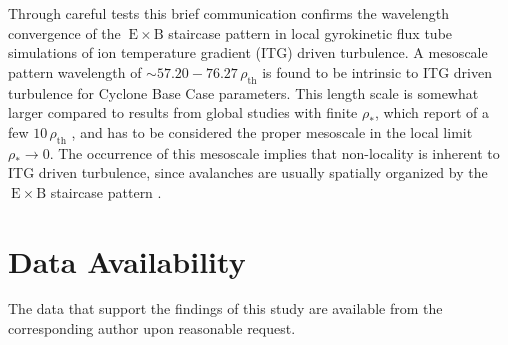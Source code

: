\documentclass[aip, amsmath, amssymb, reprint, twocolumn]{revtex4-1}
\newcommand{\exb}{\mathrm{\:E}\times\mathrm{B}}
\newcommand{\rhoth}{\rho_\mathrm{th}}
\begin{document}

Through careful tests this brief communication confirms the wavelength convergence of the $\exb$ staircase pattern in local gyrokinetic flux tube simulations of ion temperature gradient (ITG) driven turbulence.
A mesoscale pattern wavelength of $\sim 57.20 - 76.27\,\rhoth$ is found to be intrinsic to ITG driven turbulence for Cyclone Base Case parameters.
This length scale is somewhat larger compared to results from global studies with finite $\rho_\ast$, which report of a few $10\,\rhoth$ \cite{pradalier2010}, and has to be considered the proper mesoscale in the local limit $\rho_\ast \rightarrow 0$.  
The occurrence of this mesoscale implies that non-locality is inherent to ITG driven turbulence, since avalanches are usually spatially organized by the $\exb$ staircase pattern \cite{mcmillan2009, pradalier2010, rath2016, peeters2016}. 



\section*{Data Availability}
The data that support the findings of this study are available from the corresponding author upon reasonable request. 


\wordcountmessage


\end{document}
